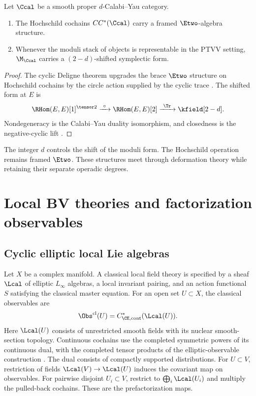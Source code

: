 \begin{theorem}
Let $\Ccal$ be a smooth proper $d$-Calabi--Yau category.
\begin{enumerate}
\item The Hochschild cochains $CC^*(\Ccal)$ carry a framed $\Etwo$-algebra structure.
\item Whenever the moduli stack of objects is representable in the PTVV setting, $\M_{\Ccal}$ carries a $(2-d)$-shifted symplectic form.
\end{enumerate}
\end{theorem}
\begin{proof}
The cyclic Deligne theorem upgrades the brace $\Etwo$ structure on Hochschild cochains by the circle action supplied by the cyclic trace \cite{BravRozenblyum}. The shifted form at $E$ is
\[
 \RHom(E,E)[1]^{\tensor2}
 \xrightarrow{\ \circ\ }
 \RHom(E,E)[2]
 \xrightarrow{\ \Tr\ }
 \kfield[2-d].
\]
Nondegeneracy is the Calabi--Yau duality isomorphism, and closedness is the negative-cyclic lift \cite{PTVV,BravDyckerhoff}.
\end{proof}

The integer $d$ controls the shift of the moduli form. The Hochschild operation remains framed $\Etwo$. These structures meet through deformation theory while retaining their separate operadic degrees.

\chapter{Local BV theories and factorization observables}
\section{Cyclic elliptic local Lie algebras}
Let $X$ be a complex manifold. A classical local field theory is specified by a sheaf $\Lcal$ of elliptic $L_\infty$ algebras, a local invariant pairing, and an action functional $S$ satisfying the classical master equation. For an open set $U\subset X$, the classical observables are
\[
 \Obs^{\mathrm{cl}}(U)=C^*_{\CE,\mathrm{cont}}(\Lcal(U)).
\]
Here $\Lcal(U)$ consists of unrestricted smooth fields with its
nuclear smooth-section topology. Continuous cochains use the completed
symmetric powers of its continuous dual, with the completed tensor
products of the elliptic-observable construction \cite{CG1,CG2}.
The dual consists of compactly supported distributions.
For $U\subset V$, restriction of fields $\Lcal(V)\to\Lcal(U)$
induces the covariant map on observables.
For pairwise disjoint $U_i\subset V$, restrict to
$\bigoplus_i\Lcal(U_i)$ and multiply the pulled-back cochains.
These are the prefactorization maps.

